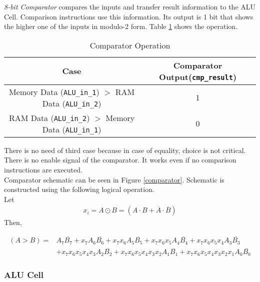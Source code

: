 \documentclass[12pt]{article}
\begin{document}
\textsl{8-bit Comparator} compares the inputs and transfer result information to the ALU Cell. Comparison instructions use this information. Its output is 1 bit that shows the higher one of the inputs in modulo-2 form. Table \ref{compmode} shows the operation.\\

\begin{table}[h]
\centering
\begin{tabular}{|c|c|}
\hline 
\textbf{Case} & \textbf{Comparator Output}(\verb|cmp_result|) \\ 
\hline 
Memory Data (\verb|ALU_in_1|) $>$ RAM Data (\verb|ALU_in_2|) & 1 \\ 
\hline 
RAM Data (\verb|ALU_in_2|) $>$ Memory Data (\verb|ALU_in_1|) & 0 \\ 
\hline 
\end{tabular} 
\caption{Comparator Operation}
\label{compmode}
\end{table}

There is no need of third case because in case of equality, choice is not critical. There is no enable signal of the comparator. It works even if no comparison instructions are executed.\\

Comparator schematic can be seen in Figure \ref{comparator}. Schematic is constructed using the following logical operation.\\

Let 
\begin{align*}
x_i = A \odot B = (A\cdot B + \overline{A}\cdot \overline{B})
\end{align*}
Then,

\begin{align*}
(A>B) = &{A_7}\overline{B_7} + x_7 {A_6}\overline{B_6} + x_7 x_6 {A_5}\overline{B_5} + x_7 x_6 x_5 {A_4}\overline{B_4} + x_7 x_6 x_5 x_4 {A_3}\overline{B_3} \\
 &+ x_7 x_6 x_5 x_4 x_3 {A_2}\overline{B_2} + x_7 x_6 x_5 x_4 x_3 x_2 {A_1}\overline{B_1} + x_7 x_6 x_5 x_4 x_3 x_2 x_1 {A_0}\overline{B_0}
\end{align*}





\subsubsection*{ALU Cell}
\end{document}
